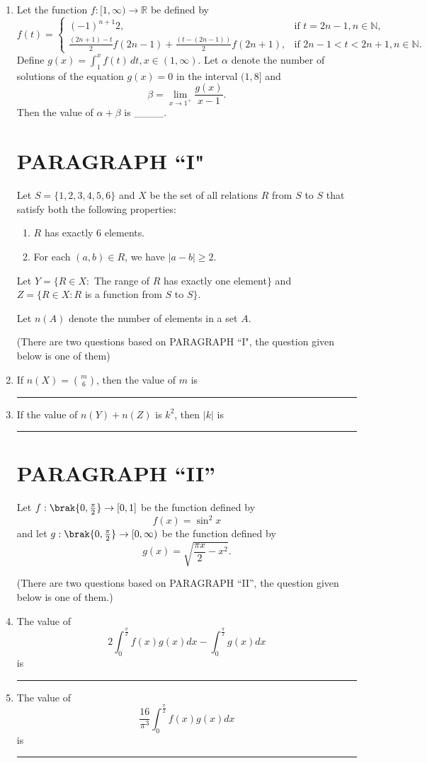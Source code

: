 \documentclass[12pt,a4paper]{article}
\begin{document}
\begin{enumerate}
    \item Let the function $ f : [1, \infty) \to \mathbb{R} $ be defined by  
\[
    f(t) =
    \begin{cases} 
    (-1)^{n+1} 2, & \text{if } t = 2n - 1, n \in \mathbb{N}, \\ 
    \frac{(2n+1)-t}{2} f(2n-1) + \frac{(t - (2n-1))}{2} f(2n+1), & \text{if } 2n - 1 < t < 2n + 1, n \in \mathbb{N}.
    \end{cases}
\]
    Define $ g(x) = \int_1^x f(t) \, dt, x \in (1, \infty) $. Let $ \alpha $ denote the number of solutions of the equation $ g(x) = 0 $ in the interval $ (1,8] $ and  
\[
    \beta = \lim\limits_{x \to 1^+} \frac{g(x)}{x-1}.
\]
    Then the value of $ \alpha + \beta $ is \_\_\_\_.


\section*{PARAGRAPH ``I"}

Let $S = \{1,2,3,4,5,6\}$ and $X$ be the set of all relations $R$ from $S$ to $S$ that satisfy both the following properties:

\begin{enumerate}[label=\Alph*.]
    \item $R$ has exactly 6 elements.
    \item For each $(a,b) \in R$, we have $|a - b| \geq 2$.
\end{enumerate}

Let $Y = \{ R \in X :$ The range of $R$ has exactly one element$\}$ and  
$Z = \{ R \in X : R$ is a function from $S$ to $S\}$.  

Let $n(A)$ denote the number of elements in a set $A$.

(There are two questions based on PARAGRAPH ``I", the question given below is one of them)

\item If $n(X) = \binom{m}{6}$, then the value of $m$ is   \rule{1cm}{0.01pt}

\item If the value of $n(Y) + n(Z)$ is $k^2$, then $|k|$ is  \rule{1cm}{0.01pt}
\section*{PARAGRAPH ``II''}

Let $ f: \brak{ 0, \frac{\pi}{2} } \to [0,1] $ be the function defined by  
\[
f(x) = \sin^2 x
\]
and let $ g: \brak{ 0, \frac{\pi}{2} } \to [0, \infty) $ be the function defined by  
\[
g(x) = \sqrt{\frac{\pi x}{2} - x^2}.
\]

(There are two questions based on PARAGRAPH ``II'', the question given below is one of them.)

\item The value of  
\[
    2 \int_{0}^{\frac{\pi}{2}} f(x) g(x)dx - \int_{0}^{\frac{\pi}{2}} g(x)dx
\]
    is \rule{1cm}{0.01pt}
\item The value of  
\[
    \frac{16}{\pi^3} \int_{0}^{\frac{\pi}{2}} f(x) g(x)dx
\]
    is \rule{1cm}{0.01pt}
\end{enumerate}
\end{document}

